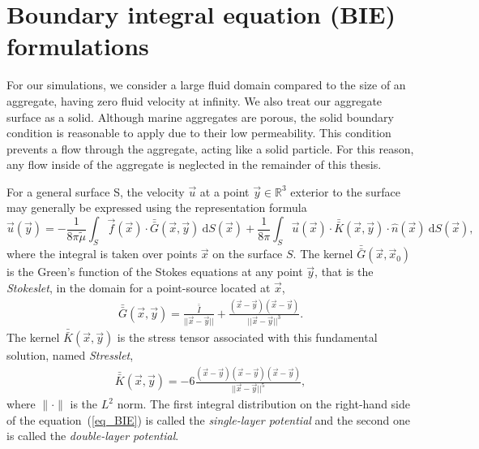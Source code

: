 \section{Boundary integral equation (BIE) formulations} 
For our simulations, we consider a large fluid domain compared to the size of an aggregate, having zero fluid velocity at infinity. We also treat our aggregate surface as a solid. Although marine aggregates are porous, the solid boundary condition is reasonable to apply due to their low permeability. 
This condition prevents a flow through the aggregate, acting like a solid particle. For this reason, any flow inside of the aggregate is neglected in the remainder of this thesis.  
\par
For a general surface S, the velocity $\vec{u}$ at a point $\vec{y}\in \mathbb{R}^3$ exterior to the surface may generally be expressed using the representation formula~\cite{pozrikidis_boundary_1992}
\begin{equation}
   \vec{u}(\vec{y}) =
	- \frac{1}{8 \pi {\tilde{\mu}}} \int_S  \vec{f}(\vec{x}) \cdot \bar{\bar{G}}(\vec{x},\vec{y}) \ \text{d}S(\vec{x}) 
+ \frac{1}{8 \pi} \int_S
\vec{u}(\vec{x}) \cdot  \bar{\bar{K}}(\vec{x},\vec{y})  
\cdot \hat{n} ( \vec{x})
\ \text{d}S(\vec{x}),
\label{eq_BIE}
\end{equation}
where the integral is taken over points $\vec{x}$ on the surface $S$.
The kernel $\bar{\bar{G}}(\vec{x},\vec{x}_0)$ is the Green's function of the Stokes equations at any point $\vec{y}$, that is the {\textit{Stokeslet}}, in the domain for a point-source located at $\vec{x}$,
\begin{align}
  \bar{\bar{G}}(\vec{x},\vec{y}) =   
  \frac{\bar{\bar{I}}}{||\vec{x}-\vec{y}||} + \frac{(\vec{x}-\vec{y})(\vec{x}-\vec{y})}{||\vec{x}-\vec{y}||^3}.
  \label{eq_stokeslet}
  \end{align}
  The kernel  $\bar{\bar{K}}(\vec{x},\vec{y})$ is the stress tensor associated with this fundamental solution, named {\textit{Stresslet}},
  \begin{align}
  \bar{\bar{K}}(\vec{x},\vec{y}) = 
  -6\frac{(\vec{x}-\vec{y})(\vec{x}-\vec{y}) (\vec{x}-\vec{y})}{||\vec{x}-\vec{y}||^5},
  \label{eq_stresslet}
  \end{align}
where $\| \cdot \|$ is the $L^2$ norm. 
The first integral distribution on the right-hand side of the equation~(\ref{eq_BIE}) is called the \textit{single-layer potential} and the second one is called the \textit{double-layer potential}. 
